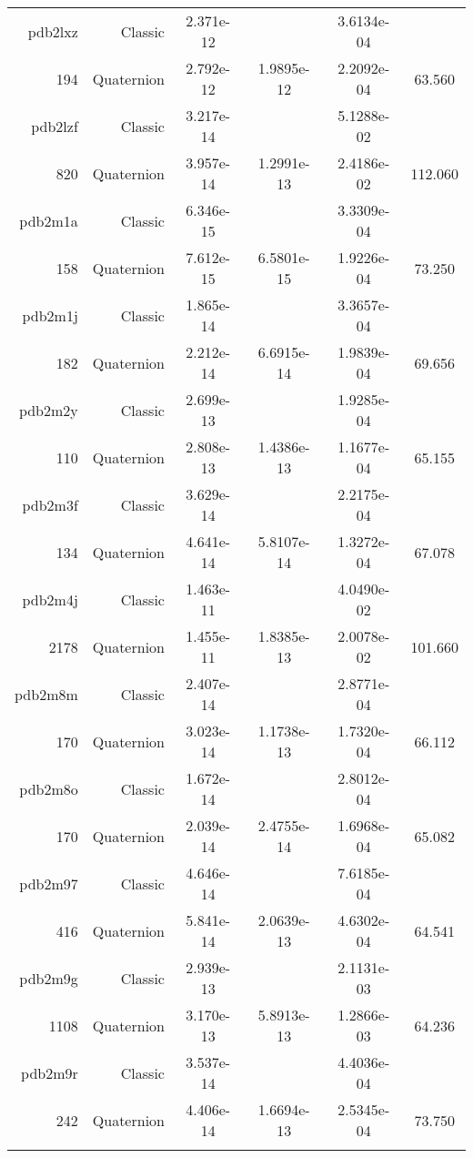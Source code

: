 \begin{xltabular}{\textwidth}{r|rS[table-format=1.3e+2]S[table-format=1.4e+2]S[table-format=1.4e+2]S[table-format=-1.3]}
pdb2lxz & Classic & 2.371e-12 &  & 3.6134e-04 & \\
194 & Quaternion & 2.792e-12 & 1.9895e-12 & 2.2092e-04 & 63.560\\  \addlinespace
pdb2lzf & Classic & 3.217e-14 &  & 5.1288e-02 & \\
820 & Quaternion & 3.957e-14 & 1.2991e-13 & 2.4186e-02 & 112.060\\  \addlinespace
pdb2m1a & Classic & 6.346e-15 &  & 3.3309e-04 & \\
158 & Quaternion & 7.612e-15 & 6.5801e-15 & 1.9226e-04 & 73.250\\  \addlinespace
pdb2m1j & Classic & 1.865e-14 &  & 3.3657e-04 & \\
182 & Quaternion & 2.212e-14 & 6.6915e-14 & 1.9839e-04 & 69.656\\  \addlinespace
pdb2m2y & Classic & 2.699e-13 &  & 1.9285e-04 & \\
110 & Quaternion & 2.808e-13 & 1.4386e-13 & 1.1677e-04 & 65.155\\  \addlinespace
pdb2m3f & Classic & 3.629e-14 &  & 2.2175e-04 & \\
134 & Quaternion & 4.641e-14 & 5.8107e-14 & 1.3272e-04 & 67.078\\  \addlinespace
pdb2m4j & Classic & 1.463e-11 &  & 4.0490e-02 & \\
2178 & Quaternion & 1.455e-11 & 1.8385e-13 & 2.0078e-02 & 101.660\\  \addlinespace
pdb2m8m & Classic & 2.407e-14 &  & 2.8771e-04 & \\
170 & Quaternion & 3.023e-14 & 1.1738e-13 & 1.7320e-04 & 66.112\\  \addlinespace
pdb2m8o & Classic & 1.672e-14 &  & 2.8012e-04 & \\
170 & Quaternion & 2.039e-14 & 2.4755e-14 & 1.6968e-04 & 65.082\\  \addlinespace
pdb2m97 & Classic & 4.646e-14 &  & 7.6185e-04 & \\
416 & Quaternion & 5.841e-14 & 2.0639e-13 & 4.6302e-04 & 64.541\\  \addlinespace
pdb2m9g & Classic & 2.939e-13 &  & 2.1131e-03 & \\
1108 & Quaternion & 3.170e-13 & 5.8913e-13 & 1.2866e-03 & 64.236\\  \addlinespace
pdb2m9r & Classic & 3.537e-14 &  & 4.4036e-04 & \\
242 & Quaternion & 4.406e-14 & 1.6694e-13 & 2.5345e-04 & 73.750\\  \addlinespace

\end{xltabular}
